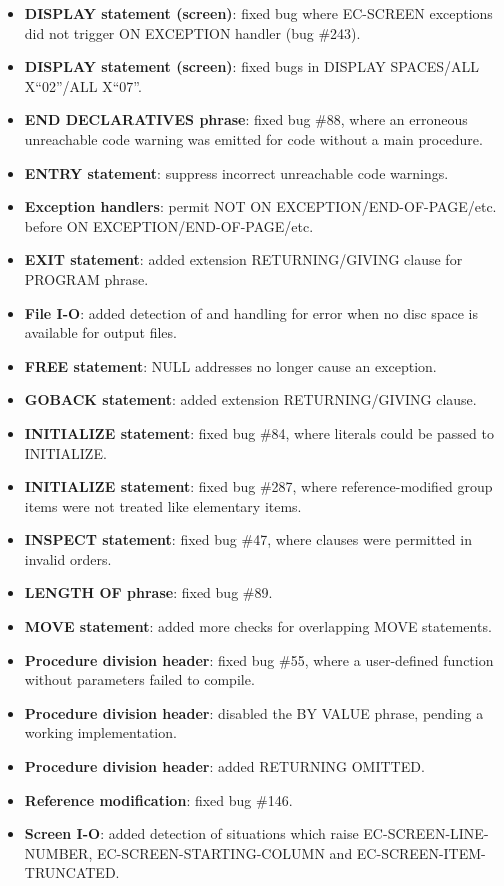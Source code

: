\begin{itemize}
\item \textbf{DISPLAY statement (screen)}: fixed bug where EC-SCREEN exceptions did not trigger ON EXCEPTION handler (bug \#243).
\item \textbf{DISPLAY statement (screen)}: fixed bugs in DISPLAY SPACES\slash{}ALL X``02''\slash{}ALL X``07''.
\item \textbf{END DECLARATIVES phrase}: fixed bug \#88, where an erroneous unreachable code warning was emitted for code without a main procedure.
\item \textbf{ENTRY statement}: suppress incorrect unreachable code warnings.
\item \textbf{Exception handlers}: permit NOT ON EXCEPTION\slash{}END-OF-PAGE\slash{}etc. before ON EXCEPTION\slash{}END-OF-PAGE\slash{}etc.
\item \textbf{EXIT statement}: added extension RETURNING\slash{}GIVING clause for PROGRAM phrase.
\item \textbf{File I-O}: added detection of and handling for error when no disc space is available for output files.
\item \textbf{FREE statement}: NULL addresses no longer cause an exception.
\item \textbf{GOBACK statement}: added extension RETURNING\slash{}GIVING clause.
\item \textbf{INITIALIZE statement}: fixed bug \#84, where literals could be passed to INITIALIZE.
\item \textbf{INITIALIZE statement}: fixed bug \#287, where reference-modified group items were not treated like elementary items.
\item \textbf{INSPECT statement}: fixed bug \#47, where clauses were permitted in invalid orders.
\item \textbf{LENGTH OF phrase}: fixed bug \#89.
\item \textbf{MOVE statement}: added more checks for overlapping MOVE statements.
\item \textbf{Procedure division header}: fixed bug \#55, where a user-defined function without parameters failed to compile.
\item \textbf{Procedure division header}: disabled the BY VALUE phrase, pending a working implementation.
\item \textbf{Procedure division header}: added RETURNING OMITTED.
\item \textbf{Reference modification}: fixed bug \#146.
\item \textbf{Screen I-O}: added detection of situations which raise EC-SCREEN-LINE-NUMBER, EC-SCREEN-STARTING-COLUMN and EC-SCREEN-ITEM-TRUNCATED.

\end{itemize}
